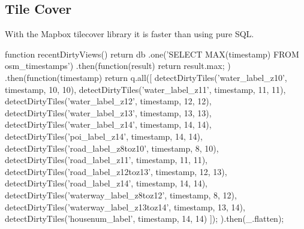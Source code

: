 \subsection{Tile Cover}

With the Mapbox tilecover library it is faster than using pure SQL.

\begin{javascriptcode}
function recentDirtyViews() {
    return db
        .one('SELECT MAX(timestamp) FROM osm_timestamps')
        .then(function(result) { return result.max; })
        .then(function(timestamp) {
            return q.all([
                detectDirtyTiles('water_label_z10', timestamp, 10, 10),
                detectDirtyTiles('water_label_z11', timestamp, 11, 11),
                detectDirtyTiles('water_label_z12', timestamp, 12, 12),
                detectDirtyTiles('water_label_z13', timestamp, 13, 13),
                detectDirtyTiles('water_label_z14', timestamp, 14, 14),
                detectDirtyTiles('poi_label_z14', timestamp, 14, 14),
                detectDirtyTiles('road_label_z8toz10', timestamp, 8, 10),
                detectDirtyTiles('road_label_z11', timestamp, 11, 11),
                detectDirtyTiles('road_label_z12toz13', timestamp, 12, 13),
                detectDirtyTiles('road_label_z14', timestamp, 14, 14),
                detectDirtyTiles('waterway_label_z8toz12', timestamp, 8, 12),
                detectDirtyTiles('waterway_label_z13toz14', timestamp, 13, 14),
                detectDirtyTiles('housenum_label', timestamp, 14, 14)
            ]);
        }).then(_.flatten);
}
\end{javascriptcode}
